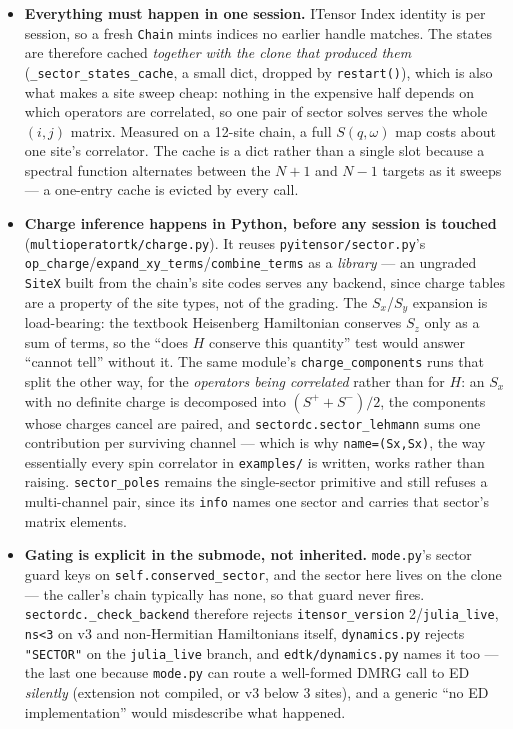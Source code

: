 \documentclass[11pt]{article}
\begin{document}
\begin{itemize}
\item \textbf{Everything must happen in one session.} ITensor Index
  identity is per session, so a fresh \texttt{Chain} mints indices no
  earlier handle matches. The states are therefore cached \emph{together
  with the clone that produced them}
  (\texttt{\_sector\_states\_cache}, a small dict, dropped by
  \texttt{restart()}), which is also what makes a site sweep cheap:
  nothing in the expensive half depends on which operators are
  correlated, so one pair of sector solves serves the whole $(i,j)$
  matrix. Measured on a 12-site chain, a full $S(q,\omega)$ map costs
  about one site's correlator. The cache is a dict rather than a single
  slot because a spectral function alternates between the $N+1$ and $N-1$
  targets as it sweeps --- a one-entry cache is evicted by every call.
\item \textbf{Charge inference happens in Python, before any session is
  touched} (\texttt{multioperatortk/charge.py}). It reuses
  \texttt{pyitensor/sector.py}'s
  \texttt{op\_charge}/\texttt{expand\_xy\_terms}/\texttt{combine\_terms}
  as a \emph{library} --- an ungraded \texttt{SiteX} built from the
  chain's site codes serves any backend, since charge tables are a
  property of the site types, not of the grading. The $S_x$/$S_y$
  expansion is load-bearing: the textbook Heisenberg Hamiltonian
  conserves $S_z$ only as a sum of terms, so the ``does $H$ conserve this
  quantity'' test would answer ``cannot tell'' without it. The same
  module's \texttt{charge\_components} runs that split the other way, for
  the \emph{operators being correlated} rather than for $H$: an $S_x$
  with no definite charge is decomposed into $(S^++S^-)/2$, the
  components whose charges cancel are paired, and
  \texttt{sectordc.sector\_lehmann} sums one contribution per surviving
  channel --- which is why \texttt{name=(Sx,Sx)}, the way essentially
  every spin correlator in \texttt{examples/} is written, works rather
  than raising. \texttt{sector\_poles} remains the single-sector
  primitive and still refuses a multi-channel pair, since its
  \texttt{info} names one sector and carries that sector's matrix
  elements.
\item \textbf{Gating is explicit in the submode, not inherited.}
  \texttt{mode.py}'s sector guard keys on
  \texttt{self.conserved\_sector}, and the sector here lives on the clone
  --- the caller's chain typically has none, so that guard never fires.
  \texttt{sectordc.\_check\_backend} therefore rejects
  \texttt{itensor\_version} 2/\texttt{julia\_live}, \texttt{ns<3} on v3
  and non-Hermitian Hamiltonians itself, \texttt{dynamics.py} rejects
  \texttt{"SECTOR"} on the \texttt{julia\_live} branch, and
  \texttt{edtk/dynamics.py} names it too --- the last one because
  \texttt{mode.py} can route a well-formed DMRG call to ED
  \emph{silently} (extension not compiled, or v3 below 3 sites), and a
  generic ``no ED implementation'' would misdescribe what happened.
\end{itemize}
\end{document}
